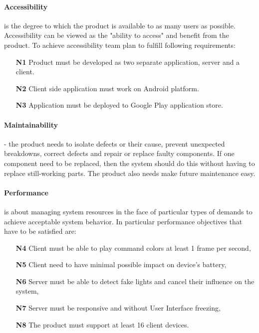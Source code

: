 \paragraph{Accessibility}
is the degree to which the product is available to as many users as possible. 
Accessibility can be viewed as the "ability to access" and benefit from the product. 
To achieve accessibility team plan to fulfill following requirements:
\begin{enumerate}
\item[\textbf{N1}] \label{req_N1} Product must be developed as two separate application, server and a client.
\item[\textbf{N2}] \label{req_N2} Client side application must work on Android platform.
\item[\textbf{N3}] \label{req_N3} Application must be deployed to Google Play application store.
\end{enumerate}

\paragraph{Maintainability}
- the product needs to isolate defects or their cause, prevent unexpected breakdowns, correct defects and repair or replace faulty components. If one component need to be replaced, then the system should do this without having to replace still-working parts. The product also needs make future maintenance easy. 

\paragraph{Performance}
is about managing system resources in the face of particular types of demands to achieve acceptable system behavior. In particular performance objectives that have to be satisfied are:
\begin{itemize}
\item [\textbf{N4}] \label{req_N4}  Client must be able to play command colors at least 1 frame per second,
\item [\textbf{N5}] \label{req_N5} Client need to have minimal possible impact on device's battery, 
\item [\textbf{N6}] \label{req_N6} Server must be able to detect fake lights and cancel their influence on the system,
\item [\textbf{N7}] \label{req_N7} Server must be responsive and without User Interface freezing,
\item[\textbf{N8}] \label{req_N8} The product must support at least 16 client devices.
\end{itemize}


